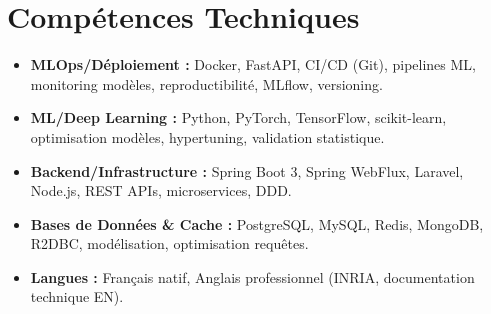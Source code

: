 \documentclass[a4paper,11pt]{article}
\begin{document}
\section{Comp\'etences Techniques}
\begin{itemize}[leftmargin=*, label=\tiny$\bullet$, nosep]
    \item \textbf{MLOps/D\'eploiement :} Docker, FastAPI, CI/CD (Git), pipelines ML, monitoring mod\`eles, reproductibilit\'e, MLflow, versioning.
    \item \textbf{ML/Deep Learning :} Python, PyTorch, TensorFlow, scikit-learn, optimisation mod\`eles, hypertuning, validation statistique.
    \item \textbf{Backend/Infrastructure :} Spring Boot 3, Spring WebFlux, Laravel, Node.js, REST APIs, microservices, DDD.
    \item \textbf{Bases de Donn\'ees \& Cache :} PostgreSQL, MySQL, Redis, MongoDB, R2DBC, mod\'elisation, optimisation requ\^etes.
    \item \textbf{Langues :} Fran\c{c}ais natif, Anglais professionnel (INRIA, documentation technique EN).
\end{itemize}
\end{document}
